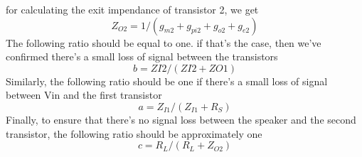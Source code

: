for calculating the exit impendance of transistor 2, we get 
\begin{equation*}
    Z_{O2} = 1/(g_{m2}+g_{pi2}+g_{o2}+g_{e2})
\end{equation*}
The following ratio should be equal to one. if that's the case, then we've confirmed there's a small loss of signal between the transistors
\begin{equation*}
    b = ZI2/(ZI2+ ZO1)
\end{equation*}
Similarly, the following ratio should be one if there's a small loss of signal between Vin and the first transistor 
\begin{equation*}
    a = Z_{I1}/(Z_{I1}+R_{S})
\end{equation*}
Finally, to ensure that there's no signal loss between the speaker and the second transistor, the following ratio should be approximately one
\begin{equation*}
    c = R_{L}/(R_{L}+Z_{O2})
\end{equation*}